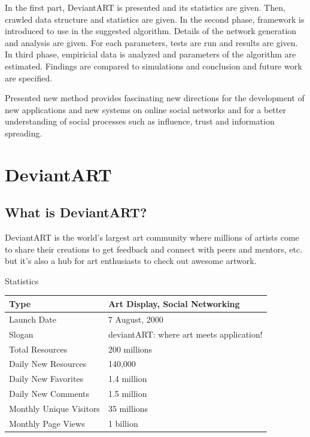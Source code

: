 \documentclass[12pt,a4paper]{report}
\begin{document}
	\par In the first part, DeviantART is presented and its statistics are given. Then, crawled data structure and statistics are given. In the second phase, framework is introduced to use in the suggested algorithm. Details of the network generation and analysis are given. For each parameters, tests are run and results are given. In third phase, empiricial data is analyzed and parameters of the algorithm are estimated. Findings are compared to simulations and conclusion and future work are specified.

	\par Presented new method provides fascinating new directions for the development of new applications and new systems on online social networks and for a better understanding of social processes such as influence, trust and information spreading.

\chapter{DeviantART}

	\section{What is DeviantART?}

	\par \hspace{0.6cm} DeviantART is the world's largest art community where millions of artists come to share their creations to get feedback and connect with peers and mentors, etc. but it's also a hub for art enthusiasts to check out awesome artwork.

	\begin{table}[htdp]
	\begin{center}
	\textup{\Large Statistics} 
	\begin{tabular}{|p{5cm}|p{8cm}|}
	\hline
	Type & Art Display,  Social Networking\\
	\hline
	 Launch Date & 7 August, 2000\\
	\hline
	Slogan & deviantART: where art meets application! \\
	\hline
	Total Resources & 200 millions\\
	\hline
	Daily New Resources &140,000\\
	\hline
	Daily New Favorites & 1.4 million\\
	\hline
	Daily New Comments & 1.5 million\\
	\hline
	Monthly Unique Visitors & 35 millions\\
	\hline
	Monthly Page Views & 1 billion\\
	\hline
	\end{tabular}
	\end{center}
	\end{table}
\end{document}
